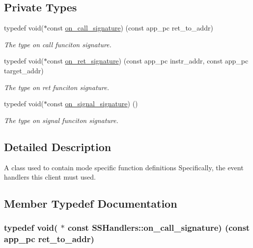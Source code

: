 \subsection*{Private Types}
\begin{DoxyCompactItemize}
\item 
typedef void($\ast$const \hyperlink{class_s_s_handlers_aa202bfb2f7c6236c0f1ee6f61d366487}{on\+\_\+call\+\_\+signature}) (const app\+\_\+pc ret\+\_\+to\+\_\+addr)
\begin{DoxyCompactList}\small\item\em The type \textquotesingle{}on call\textquotesingle{} funciton signature. \end{DoxyCompactList}\item 
typedef void($\ast$const \hyperlink{class_s_s_handlers_a0aff437ef4f59faacb14bb1fb55e214c}{on\+\_\+ret\+\_\+signature}) (const app\+\_\+pc instr\+\_\+addr, const app\+\_\+pc target\+\_\+addr)
\begin{DoxyCompactList}\small\item\em The type \textquotesingle{}on ret\textquotesingle{} funciton signature. \end{DoxyCompactList}\item 
typedef void($\ast$const \hyperlink{class_s_s_handlers_a7b77d0dda29c2fe22e6aeddd4807387f}{on\+\_\+signal\+\_\+signature}) ()
\begin{DoxyCompactList}\small\item\em The type \textquotesingle{}on signal\textquotesingle{} funciton signature. \end{DoxyCompactList}\end{DoxyCompactItemize}


\subsection{Detailed Description}
A class used to contain mode specific function definitions Specifically, the event handlers this client must used. 

\subsection{Member Typedef Documentation}
\subsubsection[{\texorpdfstring{on\+\_\+call\+\_\+signature}{on_call_signature}}]{\setlength{\rightskip}{0pt plus 5cm}typedef void( $\ast$ const S\+S\+Handlers\+::on\+\_\+call\+\_\+signature) (const app\+\_\+pc ret\+\_\+to\+\_\+addr)\hspace{0.3cm}{\ttfamily [private]}}\hypertarget{class_s_s_handlers_aa202bfb2f7c6236c0f1ee6f61d366487}{}\label{class_s_s_handlers_aa202bfb2f7c6236c0f1ee6f61d366487}


